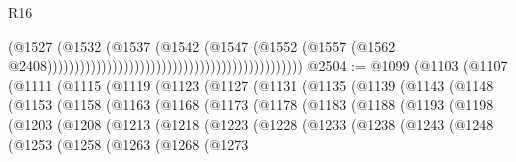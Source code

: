 \begin{lexlean}{R16}
\begin{coremodule}
                                                                                  (@1527
                                                                                    (@1532
                                                                                      (@1537
                                                                                        (@1542
                                                                                          (@1547
                                                                                            (@1552
                                                                                              (@1557
                                                                                                (@1562
                                                                                                  @2408)))))))))))))))))))))))))))))))))))))))))))))))
@2504 := @1099
    (@1103
      (@1107
        (@1111
          (@1115
            (@1119
              (@1123
                (@1127
                  (@1131
                    (@1135
                      (@1139
                        (@1143
                          (@1148
                            (@1153
                              (@1158
                                (@1163
                                  (@1168
                                    (@1173
                                      (@1178
                                        (@1183
                                          (@1188
                                            (@1193
                                              (@1198
                                                (@1203
                                                  (@1208
                                                    (@1213
                                                      (@1218
                                                        (@1223
                                                          (@1228
                                                            (@1233
                                                              (@1238
                                                                (@1243
                                                                  (@1248
                                                                    (@1253
                                                                      (@1258
                                                                        (@1263
                                                                          (@1268
                                                                            (@1273

\end{coremodule}
\end{lexlean}
